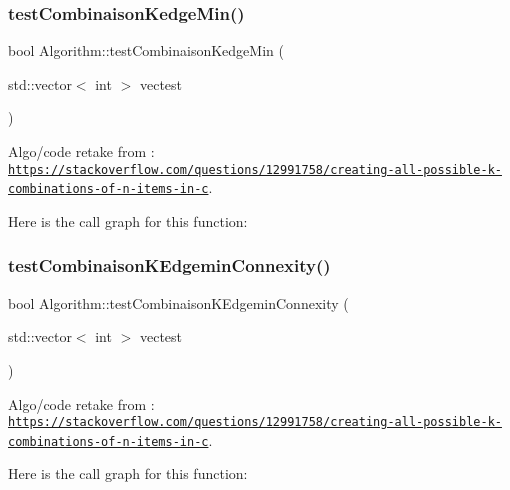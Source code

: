 \subsubsection{\texorpdfstring{test\+Combinaison\+Kedge\+Min()}{testCombinaisonKedgeMin()}}
{\footnotesize\ttfamily bool Algorithm\+::test\+Combinaison\+Kedge\+Min (\begin{DoxyParamCaption}\item[{std\+::vector$<$ int $>$}]{vectest }\end{DoxyParamCaption})}



Algo/code retake from \+: \href{https://stackoverflow.com/questions/12991758/creating-all-possible-k-combinations-of-n-items-in-c}{\tt https\+://stackoverflow.\+com/questions/12991758/creating-\/all-\/possible-\/k-\/combinations-\/of-\/n-\/items-\/in-\/c}. 

Here is the call graph for this function\+:
\mbox{\label{struct_algorithm_aaaeee5af188d63af75b53a434310a584}} 
\subsubsection{\texorpdfstring{test\+Combinaison\+K\+Edgemin\+Connexity()}{testCombinaisonKEdgeminConnexity()}}
{\footnotesize\ttfamily bool Algorithm\+::test\+Combinaison\+K\+Edgemin\+Connexity (\begin{DoxyParamCaption}\item[{std\+::vector$<$ int $>$}]{vectest }\end{DoxyParamCaption})}



Algo/code retake from \+: \href{https://stackoverflow.com/questions/12991758/creating-all-possible-k-combinations-of-n-items-in-c}{\tt https\+://stackoverflow.\+com/questions/12991758/creating-\/all-\/possible-\/k-\/combinations-\/of-\/n-\/items-\/in-\/c}. 

Here is the call graph for this function\+:
\mbox{\label{struct_algorithm_a9531505ffb0b7f99320dee47e97376bc}} 

